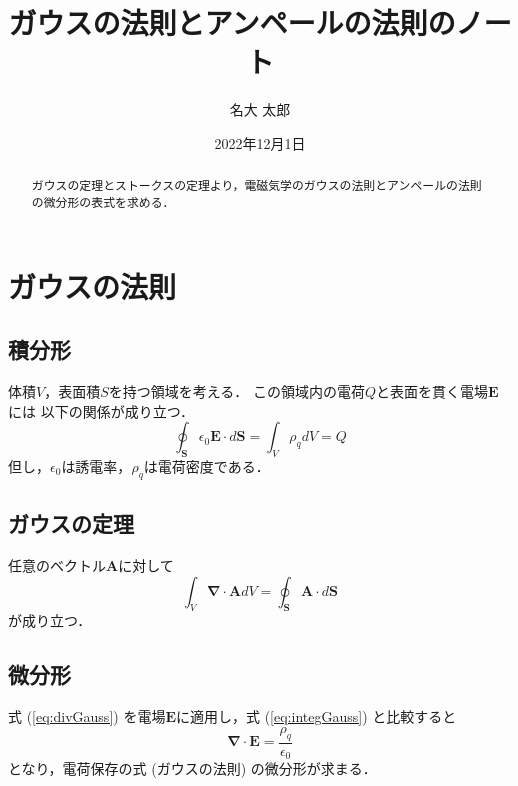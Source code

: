 \documentclass[11pt]{jarticle}
\title{ガウスの法則とアンペールの法則のノート}
\author{名大 太郎}
\date{2022年12月1日}
\begin{document}

\maketitle %

\begin{abstract} %
ガウスの定理とストークスの定理より，電磁気学のガウスの法則とアンペールの法則の微分形の表式を求める．
\end{abstract} %

\section{ガウスの法則} %
\subsection{積分形} %
体積$V$，表面積$S$を持つ領域を考える．%
この領域内の電荷$Q$と表面を貫く電場$\bm{E}$には%
以下の関係が成り立つ．
\begin{equation} %
  \oint_{\bm{S}} \epsilon_0 \bm{E} \cdot d\bm{S} = \int_{V} \rho_q dV = Q
  \label{eq:integGauss} %
\end{equation} %
但し，$\epsilon_0$は誘電率，$\rho_q$は電荷密度である．

\subsection{ガウスの定理}
任意のベクトル$\bm{A}$に対して
\begin{equation}
  \int_V \bm{\nabla \cdot A} dV = \oint_{\bm{S}}\bm{A}\cdot d\bm{S}
  \label{eq:divGauss}
\end{equation}
が成り立つ．

\subsection{微分形}
式 (\ref{eq:divGauss}) を電場$\bm{E}$に適用し，式 (\ref{eq:integGauss}) と比較すると
\begin{equation}
  \bm{\nabla \cdot E} = \frac{\rho_q}{\epsilon_0} %
\end{equation}
となり，電荷保存の式 (ガウスの法則) の微分形が求まる．
\end{document}
